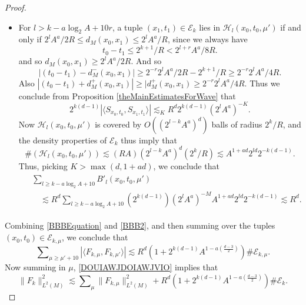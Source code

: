 \begin{proof}
\begin{itemize}[leftmargin=8mm]
    \item For $l > k - a \log_2 A + 10 r$, a tuple $(x_1,t_1) \in \mathcal{E}_k$ lies in $\mathcal{H}_l(x_0,t_0,\mu')$ if and only if $2^l A^a / 2 R \leq d_M(x_0,x_1) \leq 2^l A^a / R$, since we always have
    \begin{equation}
         t_0 - t_1 \leq 2^{k+1}/R < 2^{l+r} A^a / 8R.
    \end{equation}
    and so $d_M(x_0,x_1) \geq 2^l A^a / 2R$. And so 
    \[ |(t_0 - t_1) - d_M^-(x_0,x_1)| \geq 2^{-r} 2^l A^a / 2R - 2^{k+1} / R \geq 2^{-r} 2^l A^a / 4R. \]
    Also $|(t_0 - t_1) + d_M^+(x_0,x_1)| \geq |d_M^+(x_0,x_1) \geq 2^{-r} 2^l A^a / 4R$. Thus we conclude from Proposition \ref{theMainEstimatesForWave} that
    \begin{equation}
        2^{k(d-1)} |\langle {S\!}_{x_0,t_0}, {S\!}_{x_1,t_1} \rangle| \lesssim_K R^{d} 2^{k(d-1)} (2^l A^a)^{- K}.
    \end{equation}
    Now $\mathcal{H}_l(x_0,t_0,\mu')$ is covered by $O( (2^{l-k} A^a)^d )$ balls of radius $2^k / R$, and the density properties of $\mathcal{E}_k$ thus imply that
    \begin{equation}
        \#(\mathcal{H}_l(x_0,t_0,\mu')) \lesssim (RA) (2^{l-k} A^a)^d ( 2^k / R ) \lesssim A^{1 + ad} 2^{ld} 2^{-k(d-1)}.
    \end{equation}
    Thus, picking $K > \max(d,1+ad)$, we conclude that
    \begin{align} \label{BBB2}
    \begin{split}
        &\sum\nolimits_{l \geq k - a \log_2 A + 10} B'_l(x_0,t_0,\mu')\\
        &\quad \lesssim R^{d} \sum\nolimits_{l \geq k - a \log_2 A + 10} (2^{k(d-1)}) (2^l A^a)^{-M} A^{1 + ad} 2^{ld} 2^{-k(d-1)} \lesssim R^{d}.
    \end{split}
    \end{align}
    \end{itemize}
    Combining \eqref{BBBEquation} and \eqref{BBB2}, and then summing over the tuples $(x_0,t_0) \in \mathcal{E}_{k,\mu}$, we conclude that
    \begin{equation} \label{DOUIAWJDOIAWJVIO}
        \sum\nolimits_{\mu \geq \mu' + 10} |\langle F_{k,\mu}, F_{k,\mu'} \rangle| \lesssim R^{d} \left( 1 + 2^{k(d-1)} A^{1 - a \left( \frac{d-3}{2} \right)} \right) \# \mathcal{E}_{k,\mu}.
    \end{equation}
    Now summing in $\mu$, \eqref{DOUIAWJDOIAWJVIO} implies that
    \begin{equation} \label{DAOWDHAODWWID}
        \| F_k \|_{L^2(M)}^2 \lesssim \sum\nolimits_\mu \| F_{k,\mu} \|_{L^2(M)}^2 + R^{d} \left( 1 + 2^{k(d-1)} A^{1 - a \left( \frac{d-3}{2} \right)} \right) \# \mathcal{E}_k.
    \end{equation}
\begin{comment}


\end{comment}
\end{proof}
